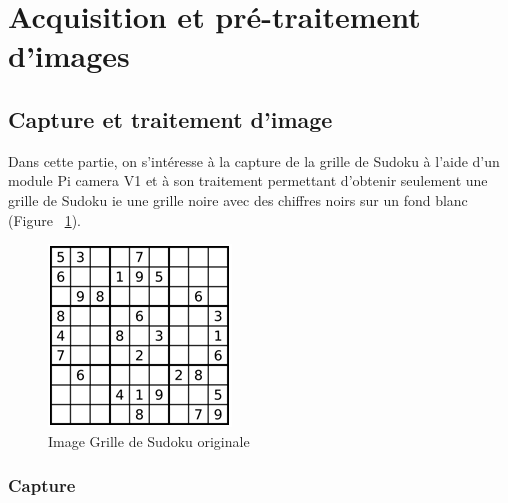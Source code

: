 \documentclass[12pt]{article}
\begin{document}
\section{Acquisition et pré-traitement d'images}
\subsection{Capture et traitement d'image}
Dans cette partie, on s'intéresse à la capture de la grille de Sudoku à l'aide d'un module Pi camera V1 et à son traitement permettant d'obtenir seulement une grille de Sudoku ie une grille noire avec des chiffres noirs sur un fond blanc (Figure ~\ref{b0}).
\begin{figure}[!h]
	\centering
   	\includegraphics[scale = 0.9]{b0.png}
   	\caption{\label{b0} Image Grille de Sudoku originale}
\end{figure}

\subsubsection{Capture}
\end{document}
